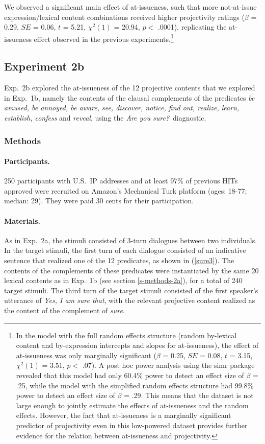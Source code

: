 \documentclass[11pt,fleqn]{article}
\newcommand{\6}{\mbox{$[\hspace*{-.6mm}[$}}
\newcommand{\9}{\mbox{$]\hspace*{-.6mm}]$}}
\begin{document}
We observed a significant main effect of at-issueness, such that more not-at-issue expression/lexical content combinations received higher projectivity ratings ($\beta$ = 0.29, $SE$ = 0.06, $t$ = 5.21, $\chi^2(1)$ = 20.94, $p <$ .0001), replicating the at-issueness effect observed in the previous experiments.\footnote{In the model with the full random effects structure (random by-lexical content and by-expression intercepts and slopes for at-issueness), the effect of at-issueness was only marginally significant ($\beta$ = 0.25, $SE$ = 0.08, $t$ = 3.15, $\chi^2(1)$ = 3.51, $p <$ .07).  A post hoc power analysis using the simr package \citep{simr} revealed that this model had only 60.4\% power to detect an effect size of $\beta$ = .25, while the model with the simplified random effects structure had 99.8\% power to detect an effect size of $\beta$ = .29. This means that the dataset is not large enough to jointly estimate the effects of at-issueness and the random effects. However, the fact that at-issueness is a marginally significant predictor of projectivity even in this low-powered dataset provides further evidence for the relation between at-issueness and projectivity.}

\subsection{Experiment 2b}\label{s-exp2b}

Exp.~2b explored the at-issueness of the 12 projective contents that we explored in Exp.~1b, namely the contents of the clausal complements of the predicates {\em be amused, be annoyed, be aware, see, discover, notice, find out, realize, learn, establish, confess} and {\em reveal}, using the {\em Are you sure?}~diagnostic.

\subsubsection{Methods}

\paragraph{Participants.} 250 participants with U.S.\ IP addresses and at least 97\% of previous HITs approved were recruited on Amazon's Mechanical Turk platform (ages: 18-77; median: 29). They were paid 30 cents for their participation.

\paragraph{Materials.} As in Exp.~2a, the stimuli consisted of 3-turn dialogues between two individuals. In the target stimuli, the first turn of each dialogue consisted of an indicative sentence that realized one of the 12 predicates, as shown in (\ref{sure3}). The contents of the complements of these predicates were instantiated by the same 20 lexical contents as in Exp.~1b (see section \ref{s-methods-2a}), for a total of 240 target stimuli. The third turn of the target stimuli consisted of the first speaker's utterance of {\em Yes, I am sure that}, with the relevant projective content realized as the content of the complement of {\em sure}. 
\end{document}

